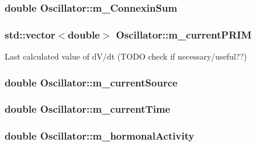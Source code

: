 \hypertarget{class_oscillator_a952e781ffe848b06b7b511c54f1d090c}{
\subsubsection[{m\+\_\+\+Connexin\+Sum}]{\setlength{\rightskip}{0pt plus 5cm}double Oscillator\+::m\+\_\+\+Connexin\+Sum}}\label{class_oscillator_a952e781ffe848b06b7b511c54f1d090c}
\hypertarget{class_oscillator_aef644a4e5faf78fa338a7a5e739f267c}{
\subsubsection[{m\+\_\+current\+P\+R\+I\+M}]{\setlength{\rightskip}{0pt plus 5cm}std\+::vector$<$double$>$ Oscillator\+::m\+\_\+current\+P\+R\+I\+M}}\label{class_oscillator_aef644a4e5faf78fa338a7a5e739f267c}


Last calculated value of d\+V/dt (T\+O\+D\+O check if necessary/useful??) 

\hypertarget{class_oscillator_a766694982f9a1f8ed7013828089587f7}{
\subsubsection[{m\+\_\+current\+Source}]{\setlength{\rightskip}{0pt plus 5cm}double Oscillator\+::m\+\_\+current\+Source}}\label{class_oscillator_a766694982f9a1f8ed7013828089587f7}
\hypertarget{class_oscillator_abe68e99fc990a44b9bd234751eec0f24}{
\subsubsection[{m\+\_\+current\+Time}]{\setlength{\rightskip}{0pt plus 5cm}double Oscillator\+::m\+\_\+current\+Time}}\label{class_oscillator_abe68e99fc990a44b9bd234751eec0f24}
\hypertarget{class_oscillator_a80a2b0beda0d17f549160fbbd456243b}{
\subsubsection[{m\+\_\+hormonal\+Activity}]{\setlength{\rightskip}{0pt plus 5cm}double Oscillator\+::m\+\_\+hormonal\+Activity}}\label{class_oscillator_a80a2b0beda0d17f549160fbbd456243b}


